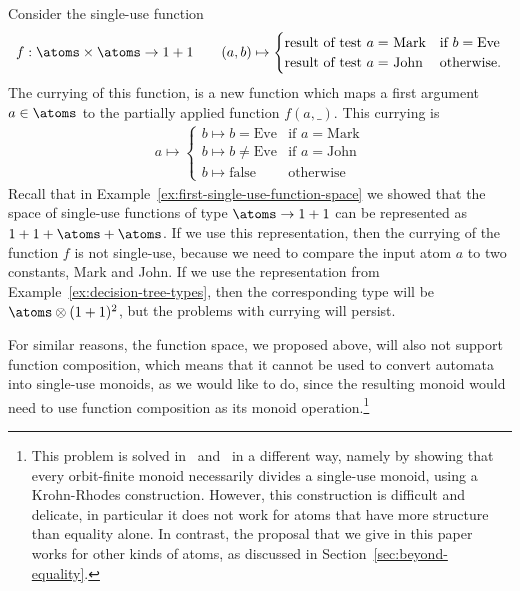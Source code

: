 \begin{example}\label{ex:currying-not-single-use}
    Consider  the single-use function
    \begin{align*}
    f : \atoms \times \atoms \to 1 + 1 \qquad (a,b)  
    \mapsto \begin{cases}
        \text{result of test $a = $ Mark} & \text{if } b = \text{Eve} \\
        \text{result of test $a = $ John} & \text{otherwise}.
        \end{cases}
    \end{align*}
The currying of this function, is a new function which  maps a first argument $a \in \atoms$ to the partially applied function $f(a,\_)$. This currying is
\begin{align*}
    a \mapsto \begin{cases}
        b \mapsto b = \text{Eve} & \text{if } a = \text{Mark} \\
        b \mapsto b \neq \text{Eve} & \text{if } a = \text{John} \\
        b \mapsto \text{false} & \text{otherwise}
        \end{cases}
\end{align*}
Recall that in Example~\ref{ex:first-single-use-function-space} we showed that the space of single-use functions of type $\atoms \to 1 + 1$ can be represented as $1 + 1 + \atoms + \atoms$. If we use this representation,  then the currying of the function $f$  is not single-use, because we need to compare the input atom $a$ to two constants, Mark and John. If we use the representation from Example~\ref{ex:decision-tree-types}, then the corresponding type will be $\atoms \otimes (1 + 1)^2$, but the problems with currying will persist. \exampleend
\end{example}

For similar reasons, 
the function space, we proposed above, will also not support function composition, which means that it cannot be used to convert automata into single-use monoids, as we would like to do, since the resulting monoid would need to use function composition as its monoid operation.\footnote{This problem is solved in~\cite{bojanczykstefanski2020} and~\cite{stefanski-phd} in a different way, namely by showing that every orbit-finite monoid necessarily divides a single-use monoid, using a  Krohn-Rhodes construction. However, this construction is difficult and delicate, in particular it does not work for atoms that have more structure than equality alone. In contrast, the proposal that we give in this paper works for other kinds of atoms, as discussed in Section~\ref{sec:beyond-equality}. }

